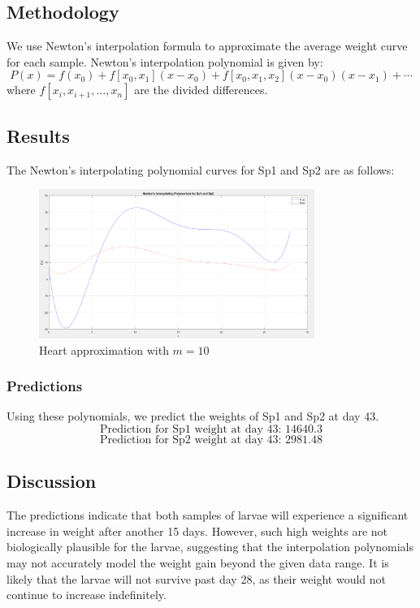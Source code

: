 \documentclass{article}
\begin{document}
\subsection{Methodology}
We use Newton's interpolation formula to approximate the average weight curve for each sample. Newton's interpolation polynomial is given by:
\[ P(x) = f(x_0) + f[x_0, x_1](x - x_0) + f[x_0, x_1, x_2](x - x_0)(x - x_1) + \cdots \]
where \( f[x_i, x_{i+1}, \ldots, x_n] \) are the divided differences.

\subsection{Results}
The Newton's interpolating polynomial curves for Sp1 and Sp2 are as follows:

\begin{figure}[H]
    \centering
    \includegraphics[width=0.8\textwidth]{sp.png}
    \caption{Heart approximation with \(m = 10\)}
    \label{fig:heart10}
\end{figure}

\subsubsection{Predictions}
Using these polynomials, we predict the weights of Sp1 and Sp2 at day 43.
\[ \text{Prediction for Sp1 weight at day 43: } 14640.3 \]
\[ \text{Prediction for Sp2 weight at day 43: } 2981.48 \]

\subsection{Discussion}
The predictions indicate that both samples of larvae will experience a significant increase in weight after another 15 days. However, such high weights are not biologically plausible for the larvae, suggesting that the interpolation polynomials may not accurately model the weight gain beyond the given data range. It is likely that the larvae will not survive past day 28, as their weight would not continue to increase indefinitely.
\end{document}
